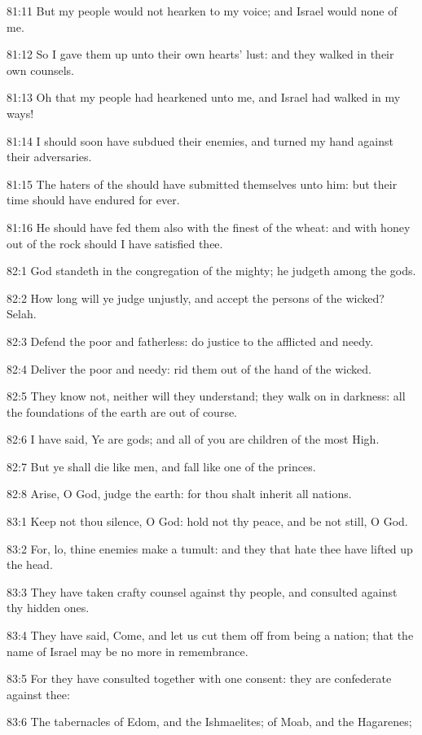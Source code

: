 81:11 But my people would not hearken to my voice; and Israel would none of me.

81:12 So I gave them up unto their own hearts' lust: and they walked in their own counsels.

81:13 Oh that my people had hearkened unto me, and Israel had walked in my ways!

81:14 I should soon have subdued their enemies, and turned my hand against their adversaries.

81:15 The haters of the \LORD should have submitted themselves unto him: but their time should have endured for ever.

81:16 He should have fed them also with the finest of the wheat: and with honey out of the rock should I have satisfied thee.



82:1 God standeth in the congregation of the mighty; he judgeth among the gods.

82:2 How long will ye judge unjustly, and accept the persons of the wicked? Selah.

82:3 Defend the poor and fatherless: do justice to the afflicted and needy.

82:4 Deliver the poor and needy: rid them out of the hand of the wicked.

82:5 They know not, neither will they understand; they walk on in darkness: all the foundations of the earth are out of course.

82:6 I have said, Ye are gods; and all of you are children of the most High.

82:7 But ye shall die like men, and fall like one of the princes.

82:8 Arise, O God, judge the earth: for thou shalt inherit all nations.



83:1 Keep not thou silence, O God: hold not thy peace, and be not still, O God.

83:2 For, lo, thine enemies make a tumult: and they that hate thee have lifted up the head.

83:3 They have taken crafty counsel against thy people, and consulted against thy hidden ones.

83:4 They have said, Come, and let us cut them off from being a nation; that the name of Israel may be no more in remembrance.

83:5 For they have consulted together with one consent: they are confederate against thee:

83:6 The tabernacles of Edom, and the Ishmaelites; of Moab, and the Hagarenes;

